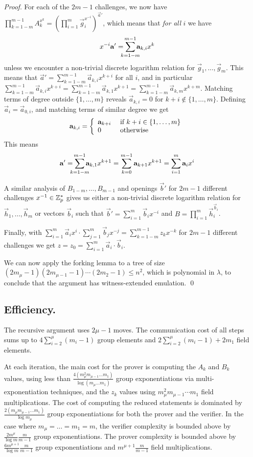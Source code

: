 \begin{proof}
For each of the $2m-1$ challenges, we now have $\prod_{k=1-m}^{m-1}A_k^{x^{k}}=\left(\prod_{i=1}^m\vec{g}_i^{x^{-i}}\right)^{\vec{a}'}$, which means that \emph{for all} $i$ we have 
%
$$x^{-i}\vec{a}'=\mkern-12mu\sum_{k=1-m}^{m-1}\mkern-12mu\vec{a}_{k,i}x^{k}$$
unless we encounter a non-trivial discrete logarithm relation for $\vec{g}_1,\ldots,\vec{g}_m$. This means that $\vec{a}'=\sum_{k=1-m}^{m-1}\vec{a}_{k,i}x^{k+i}$ for all $i$, and in particular $\sum_{k=1-m}^{m-1}\vec{a}_{k,i}x^{k+i}=\sum_{k=1-m}^{m-1}\vec{a}_{k,1}x^{k+1}=\sum_{k=1-m}^{m-1}\vec{a}_{k,m}x^{k+m}$. Matching terms of degree outside $\{1,\ldots,m\}$ reveals $\vec{a}_{k,i}=0$ for $k+i\notin \{1,\ldots,m\}$. Defining $\vec{a}_i=\vec{a}_{0,i}$, and matching terms of similar degree we get $$\vec{a}_{k,i}=\left\{ \begin{array}{ll} \vec{a}_{k+i} & \textnormal{ if } k+i\in \{1,\ldots,m\} \\ 0 & \textnormal{ otherwise }\end{array} \right .$$ 
This means $$\vec{a}'=\mkern-12mu\sum_{k=1-m}^{m-1}\mkern-12mu\vec{a}_{k,1}x^{k+1}=\sum_{k=0}^{m-1}\vec{a}_{k+1}x^{k+1}=\sum_{i=1}^m\vec{a}_ix^i$$

A similar analysis of $B_{1-m},\ldots,B_{m-1}$ and openings $\vec{b}'$ for $2m-1$ different challenges $x^{-1}\in \Z_p^*$ gives us either a non-trivial discrete logarithm relation for $\vec{h}_1,\ldots,\vec{h}_m$ or vectors $\vec{b}_i$ such that $\vec{b}'=\sum_{i=1}^m\vec{b}_ix^{-i}$ and $B=\prod_{i=1}^m\vec{h}_i^{\vec{b}_i}$. 

Finally, with $\sum_{i=1}^m\vec{a}_ix^i\cdot \sum_{j=1}^m\vec{b}_jx^{-j}=\sum_{k=1-m}^{m-1}z_kx^{-k}$ for $2m-1$ different challenges we get $z=z_0=\sum_{i=1}^m\vec{a}_i\cdot \vec{b}_i$.

We can now apply the forking lemma to a tree of size $(2m_\mu-1)(2m_{\mu-1}-1)\cdots(2m_2-1)\leq n^2$, which is polynomial in $\lambda$, to conclude that the argument has witness-extended emulation.
\qed
\end{proof}

\subsection{Efficiency.}
The recursive argument uses $2\mu-1$ moves. 
The communication cost of all steps sums up to $4\sum_{i=2}^{\mu} (m_i-1)$ group elements and $2\sum_{i=2}^{\mu } (m_i-1)+2m_1$ field elements.

At each iteration, the main cost for the prover is computing the $A_k$ and $B_k$ values, using less than $\frac{4(m_\mu^2 m_{\mu-1} \ldots m_1 )}{\log (m_\mu \ldots m_1)}$ group exponentiations via multi-exponentiation techniques, and the $z_k$ values using  $m_\mu^2 m_{\mu-1} \cdots m_1$ field multiplications. The cost of computing the reduced statements is dominated by $\frac{2(m_\mu m_{\mu-1}\ldots m_1 )}{\log m_\mu}$ group exponentiations for both the prover and the verifier. In the case where $m_\mu = \ldots = m_1 = m$, the verifier complexity is bounded above by $\frac{2 m^{\mu}}{\log m}\frac{m}{m-1}$ group exponentiations. The prover complexity is bounded above by $\frac{6 m^{\mu+1}}{\log m}\frac{m}{m-1}$ group exponentiations and $m^{\mu+1}\frac{m}{m-1}$ field multiplications.

